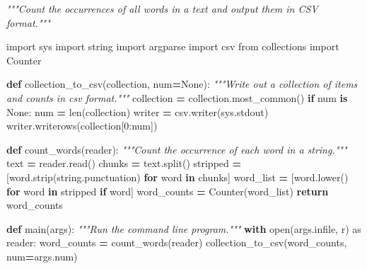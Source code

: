 \documentclass[
]{krantz}
\makeatletter
\newenvironment{Shaded}{\begin{snugshade}}{\end{snugshade}}
\newcommand{\BuiltInTok}[1]{#1}
\newcommand{\CommentTok}[1]{\textcolor[rgb]{0.56,0.35,0.01}{\textit{#1}}}
\newcommand{\ControlFlowTok}[1]{\textcolor[rgb]{0.13,0.29,0.53}{\textbf{#1}}}
\newcommand{\DecValTok}[1]{\textcolor[rgb]{0.00,0.00,0.81}{#1}}
\newcommand{\ImportTok}[1]{#1}
\newcommand{\KeywordTok}[1]{\textcolor[rgb]{0.13,0.29,0.53}{\textbf{#1}}}
\newcommand{\NormalTok}[1]{#1}
\newcommand{\OperatorTok}[1]{\textcolor[rgb]{0.81,0.36,0.00}{\textbf{#1}}}
\newcommand{\StringTok}[1]{\textcolor[rgb]{0.31,0.60,0.02}{#1}}
\newcommand{\VariableTok}[1]{\textcolor[rgb]{0.00,0.00,0.00}{#1}}
\newenvironment{kframe}{%
\medskip{}
\setlength{\fboxsep}{.8em}
 \def\at@end@of@kframe{}%
 \ifinner\ifhmode%
  \def\at@end@of@kframe{\end{minipage}}%
  \begin{minipage}{\columnwidth}%
 \fi\fi%
 \def\FrameCommand##1{\hskip\@totalleftmargin \hskip-\fboxsep
 \colorbox{shadecolor}{##1}\hskip-\fboxsep
     \hskip-\linewidth \hskip-\@totalleftmargin \hskip\columnwidth}%
 \MakeFramed {\advance\hsize-\width
   \@totalleftmargin\z@ \linewidth\hsize
   \@setminipage}}%
 {\par\unskip\endMakeFramed%
 \at@end@of@kframe}
\renewenvironment{Shaded}{\begin{kframe}}{\end{kframe}}
\makeatother
\begin{document}
\begin{Shaded}
\begin{Highlighting}[]
\CommentTok{"""Count the occurrences of all words in a text and output them in CSV format."""}

\ImportTok{import}\NormalTok{ sys}
\ImportTok{import}\NormalTok{ string}
\ImportTok{import}\NormalTok{ argparse}
\ImportTok{import}\NormalTok{ csv}
\ImportTok{from}\NormalTok{ collections }\ImportTok{import}\NormalTok{ Counter}


\KeywordTok{def}\NormalTok{ collection\_to\_csv(collection, num}\OperatorTok{=}\VariableTok{None}\NormalTok{):}
    \CommentTok{"""Write out a collection of items and counts in csv format."""}
\NormalTok{    collection }\OperatorTok{=}\NormalTok{ collection.most\_common()}
    \ControlFlowTok{if}\NormalTok{ num }\KeywordTok{is} \VariableTok{None}\NormalTok{:}
\NormalTok{        num }\OperatorTok{=} \BuiltInTok{len}\NormalTok{(collection)}
\NormalTok{    writer }\OperatorTok{=}\NormalTok{ csv.writer(sys.stdout)}
\NormalTok{    writer.writerows(collection[}\DecValTok{0}\NormalTok{:num])}


\KeywordTok{def}\NormalTok{ count\_words(reader):}
    \CommentTok{"""Count the occurrence of each word in a string."""}
\NormalTok{    text }\OperatorTok{=}\NormalTok{ reader.read()}
\NormalTok{    chunks }\OperatorTok{=}\NormalTok{ text.split()}
\NormalTok{    stripped }\OperatorTok{=}\NormalTok{ [word.strip(string.punctuation) }\ControlFlowTok{for}\NormalTok{ word }\KeywordTok{in}\NormalTok{ chunks]}
\NormalTok{    word\_list }\OperatorTok{=}\NormalTok{ [word.lower() }\ControlFlowTok{for}\NormalTok{ word }\KeywordTok{in}\NormalTok{ stripped }\ControlFlowTok{if}\NormalTok{ word]}
\NormalTok{    word\_counts }\OperatorTok{=}\NormalTok{ Counter(word\_list)}
    \ControlFlowTok{return}\NormalTok{ word\_counts}


\KeywordTok{def}\NormalTok{ main(args):}
    \CommentTok{"""Run the command line program."""}
    \ControlFlowTok{with} \BuiltInTok{open}\NormalTok{(args.infile, }\StringTok{\textquotesingle{}r\textquotesingle{}}\NormalTok{) }\ImportTok{as}\NormalTok{ reader:}
\NormalTok{        word\_counts }\OperatorTok{=}\NormalTok{ count\_words(reader)}
\NormalTok{    collection\_to\_csv(word\_counts, num}\OperatorTok{=}\NormalTok{args.num)}



\end{Highlighting}
\end{Shaded}
\end{document}

